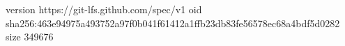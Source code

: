 version https://git-lfs.github.com/spec/v1
oid sha256:463e94975a493752a97f0b041f61412a1ffb23db83fe56578ec68a4bdf5d0282
size 349676
